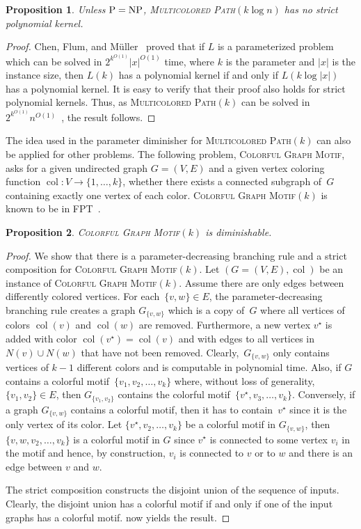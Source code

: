 \documentclass[11pt,a4,USenglish]{article}
\newcommand{\prob}[1]{\textsc{#1}}
\newcommand{\pprob}[2]{\prob{#1}$(#2)$}
\newcommand{\NP}{\textnormal{NP}}
\newcommand{\PTIME}{\textnormal{P}}
\newcommand{\FPT}{\textnormal{FPT}}
\newcommand{\PeqNP}{$\PTIME{}=\NP{}$}
\DeclareMathOperator{\col}{col}
\theoremstyle{definition}
\theoremstyle{plain}
\newtheorem{proposition}{Proposition}
\theoremstyle{remark}
\begin{document}
\begin{proposition}%
\label{prop:multicoloredpathklogn}
Unless \PeqNP{}, \pprob{Multicolored Path}{k \log n} has no strict polynomial kernel.
%
\end{proposition}
%
%
{
  \begin{proof}
  Chen, Flum, and M\"{u}ller~\cite[Prop.~3.10]{chen2011lower} proved that if $L$ is a parameterized problem which can be solved in $2^{k^{O(1)}}|x|^{O(1)}$ time, where $k$ is the parameter and $|x|$ is the instance size, then $L(k)$ has a polynomial kernel if and only if $L(k \log |x|)$ has a polynomial kernel. 
  It is easy to verify that their proof also holds for strict polynomial kernels. 
  Thus, as \pprob{Multicolored Path}{k} can be solved in $2^{k^{O(1)}}n^{O(1)}$~\cite{AlonYZ95}, the result follows.
  \end{proof}
}
%
The idea used in the parameter diminisher for \pprob{Multicolored Path}{k} can also be applied for other problems. The following problem, \prob{Colorful Graph Motif}, asks for a given undirected graph $G=(V,E)$ and a given vertex coloring function $\col:V \to \{1,\ldots,k\}$, whether there exists a connected subgraph of~$G$ containing exactly one vertex of each color. 
\pprob{Colorful Graph Motif}{k} is known to be in \FPT{}~\cite{betzler2008parameterized}.
%
\begin{proposition}%
\label{lem:coolormotifk}
\pprob{Colorful Graph Motif}{k} is diminishable.
\end{proposition}

%
{
  \begin{proof}
  We show that there is a parameter-decreasing branching rule and a strict composition for \pprob{Colorful Graph Motif}{k}. Let $(G=(V,E),\col)$ be an instance of \pprob{Colorful Graph Motif}{k}. Assume there are only edges between differently colored vertices. For each~$\{v, w\} \in E$, the parameter-decreasing branching rule creates a graph $G_{\{v, w\}}$ which is a copy of~$G$ where all vertices of colors $\col(v)$ and $\col(w)$ are removed. Furthermore, a new vertex $v^\star$ is added with color $\col(v^\star) = \col(v)$ and with edges to all vertices in~$N(v)\cup N(w)$ that have not been removed. Clearly,~$G_{\{v, w\}}$ only contains vertices of $k-1$ different colors and is computable in polynomial time. Also, if $G$ contains a colorful motif~$\{v_1, v_2, \ldots, v_k\}$ where, without loss of generality, $\{v_1, v_2\} \in E$, then $G_{\{v_1, v_2\}}$ contains the colorful motif~$\{v^\star, v_3, \ldots, v_k\}$. Conversely, if a graph $G_{\{v, w\}}$ contains a colorful motif, then it has to contain~$v^\star$ since it is the only vertex of its color. Let $\{v^\star, v_2, \ldots, v_k\}$ be a colorful motif in $G_{\{v, w\}}$, then $\{v, w, v_2, \ldots, v_k\}$ is a colorful motif in $G$ since $v^\star$ is connected to some vertex $v_i$ in the motif and hence, by construction, $v_i$ is connected to $v$ or to $w$ and there is an edge between $v$ and $w$.

  The strict composition constructs the disjoint union of the sequence of inputs. Clearly, the disjoint union has a colorful motif if and only if one of the input graphs has a colorful motif. 
   now yields the result.
  \end{proof}
}
%
%
%
\end{document}
